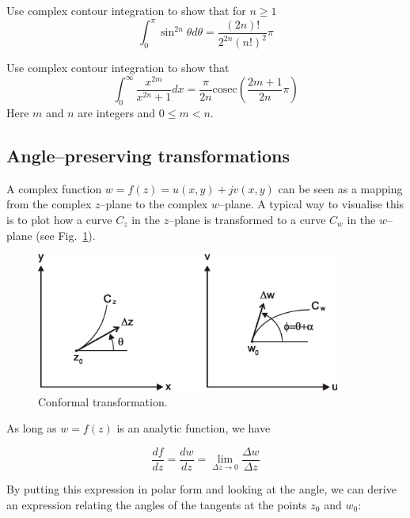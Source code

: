 \begin{sidebar}
\begin{exer}
Use complex contour integration to show that for $n \ge 1$
$$ \int_0^\pi \sin^{2n} \theta d \theta = \frac{(2n)!}{ 2^{2n}(n!)^2} \pi$$
\end{exer}

\begin{exer}
Use complex contour integration to show that
$$ \int_0^\infty \frac{x ^ {2m}}{x^{2n} + 1} dx = \frac{\pi}{2n} \mathrm{cosec}  \left( \frac{2m+1}{2n} \pi \right)$$
Here $m$ and $n$ are integers and $0 \le m < n$.
\end{exer}


\subsection*{Angle--preserving transformations}

A complex function $w = f(z) = u(x,y)+jv(x,y)$ can be seen as a mapping from the
complex $z$--plane to the complex $w$--plane. A typical way to visualise this is
to plot how a curve $C_z$ in the $z$--plane is transformed to a curve $C_w$ in
the $w$--plane (see Fig.~\ref{fig-conformal}).

\begin{figure}
\centering
\includegraphics[width=10cm]{complex/figures/conformal}
\caption{Conformal transformation.}
\label{fig-conformal}
\end{figure}

As long as $w=f(z)$ is an analytic function, we have

\begin{equation}
\frac{df}{dz} = \frac{dw}{dz} = \lim_{\Delta z \to 0} \frac{\Delta w}{\Delta z}
\end{equation}

By putting this expression in polar form and looking at the angle, we can derive
an expression relating the angles of the tangents at the points $z_0$ and $w_0$:


\end{sidebar}
